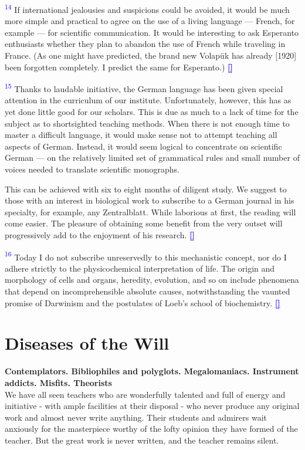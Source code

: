 \documentclass{article}
\newcommand{\boldline}[1]{%
 \vspace{\baselineskip}%
 \noindent\textbf{#1}\\[0.5\baselineskip]%
}
\newcommand{\notetext}[2]{
 \par\noindent
 \hypertarget{note:#1}{\textsuperscript{\textcolor{blue}{#1}}} #2
 \hyperlink{ref:#1}{\textcolor{blue}{\textbf{[\textuparrow]}}}
 \par\vspace{1em}
}
\begin{document}
\notetext{14}{ If international jealousies and suspicions could be avoided, it would be much more simple and practical to agree on the use of a living language — French, for example — for scientific communication. It would be interesting to ask Esperanto enthusiasts whether they plan to abandon the use of French while traveling in France. (As one might have predicted, the brand new Volapük has already [1920] been forgotten completely. I predict the same for Esperanto.) }

\notetext{15}{ Thanks to laudable initiative, the German language has been given special attention in the curriculum of our institute. Unfortunately, however, this has as yet done little good for our scholars. This is due as much to a lack of time for the subject as to shortsighted teaching methods. When there is not enough time to master a difficult language, it would make sense not to attempt teaching all aspects of German. Instead, it would seem logical to concentrate on scientific German — on the relatively limited set of grammatical rules and small number of voices needed to translate scientific monographs.

This can be achieved with six to eight months of diligent study. We suggest to those with an interest in biological work to subscribe to a German journal in his specialty, for example, any Zentralblatt. While laborious at first, the reading will come easier. The pleasure of obtaining some benefit from the very outset will progressively add to the enjoyment of his research. }

\notetext{16}{ Today I do not subscribe unreservedly to this mechanistic concept, nor do I adhere strictly to the physicochemical interpretation of life. The origin and morphology of cells and organs, heredity, evolution, and so on include phenomena that depend on incomprehensible absolute causes, notwithstanding the vaunted promise of Darwinism and the postulates of Loeb’s school of biochemistry. }

\newpage
\section{Diseases of the Will}

\boldline{Contemplators. Bibliophiles and polyglots. Megalomaniacs. Instrument addicts. Misfits. Theorists}

We have all seen teachers who are wonderfully talented and full of energy and initiative - with ample facilities at their disposal - who never produce any original work and almost never write anything. Their students and admirers wait anxiously for the masterpiece worthy of the lofty opinion they have formed of the teacher. But the great work is never written, and the teacher remains silent.
\end{document}
